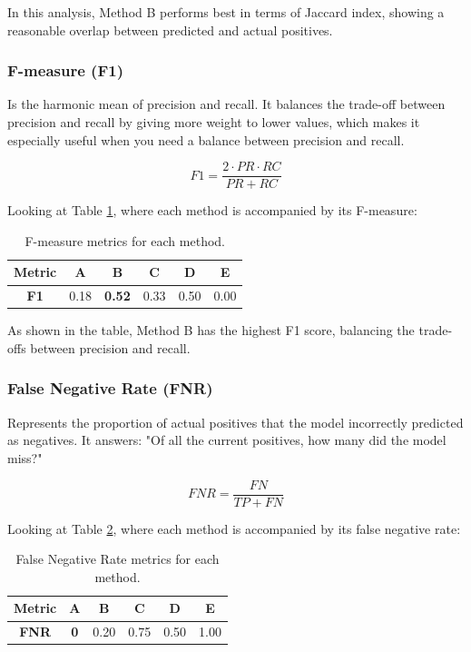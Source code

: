 \documentclass{llncs}
\begin{document}
\vspace{-20pt}

In this analysis, Method B performs best in terms of Jaccard index, showing a reasonable overlap between predicted and actual positives.

\subsubsection{F-measure (F1)}

Is the harmonic mean of precision and recall. It balances the trade-off between precision and recall by giving more weight to lower values, which makes it especially useful when you need a balance between precision and recall.

\[
F1 = \frac{2 \cdot PR \cdot RC}{PR + RC}
\]

Looking at Table \ref{tab:f1}, where each method is accompanied by its F-measure:

\begin{table}[h]
	\centering
	\begin{tabular}{|c|c|c|c|c|c|} 
		\hline 
		\textbf{Metric} & \textbf{A} & \textbf{B} & \textbf{C} & \textbf{D} & \textbf{E} \\ 
		\hline 
		\textbf{F1} & 0.18 & \textbf{0.52} & 0.33 & 0.50 & 0.00 \\ 
		\hline 
	\end{tabular} 
	\caption{F-measure metrics for each method.} 
	\label{tab:f1} 
\end{table}


As shown in the table, Method B has the highest F1 score, balancing the trade-offs between precision and recall.

\subsubsection{False Negative Rate (FNR)}
Represents the proportion of actual positives that the model incorrectly predicted as negatives. It answers: "Of all the current positives, how many did the model miss?"

\[
FNR = \frac{FN}{TP + FN}
\]

Looking at Table \ref{tab:fnr}, where each method is accompanied by its false negative rate:


\begin{table}[h]
	\centering
	\begin{tabular}{|c|c|c|c|c|c|} 
		\hline 
		\textbf{Metric} & \textbf{A} & \textbf{B} & \textbf{C} & \textbf{D} & \textbf{E} \\ 
		\hline 
		\textbf{FNR} & \textbf{0} & 0.20 & 0.75 & 0.50 & 1.00 \\ 
		\hline 
	\end{tabular} 
	\caption{False Negative Rate metrics for each method.} 
	\label{tab:fnr} 
\end{table}
\end{document}
